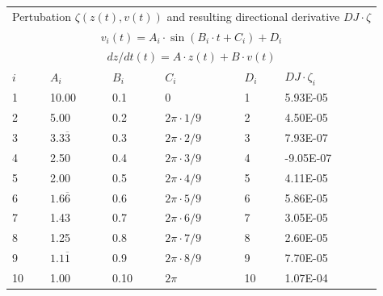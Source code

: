 \begin{center}
    \begin{tabular}{ |p{1cm}||p{2cm}|p{2cm}|p{2cm}|p{2cm}||p{2cm}|  }
        \hline
        \multicolumn{6}{|c|}{Pertubation $\zeta\left(z(t), v(t)\right)$ and resulting directional derivative $DJ\cdot\zeta$} \\
        \multicolumn{6}{|c|}{$v_i(t)=A_i\cdot\sin(B_i\cdot t+C_i)+D_i$}\\
        \multicolumn{6}{|c|}{$dz/dt(t)=A\cdot z(t)+B\cdot v(t)$}\\

        \hline
        $i$& $A_i$ & $B_i$ &$C_i$ & $D_i$ & $DJ\cdot\zeta_i$\\
        \hline
        1   & 10.00    & 0.1 &  $0$ & 1 & 5.93E-05 \\
        2  & 5.00    & 0.2 &  $2\pi\cdot1/9$ & 2 & 4.50E-05    \\
        3 & $3.3\overline{3}$    & 0.3 &  $2\pi\cdot2/9$ & 3 & 7.93E-07\\
        4  & 2.50    & 0.4 &  $2\pi\cdot3/9$ & 4 & -9.05E-07\\
        5 & 2.00    & 0.5 &  $2\pi\cdot4/9$ & 5 & 4.11E-05\\
        6 & $1.6\overline{6}$    & 0.6 &  $2\pi\cdot5/9$ & 6 &5.86E-05 \\
        7 & 1.43    & 0.7 &  $2\pi\cdot6/9$ & 7 &  3.05E-05 \\
        8 & 1.25    & 0.8 &  $2\pi\cdot7/9$ & 8 & 2.60E-05 \\
        9 & $1.1\overline{1}$    & 0.9 &  $2\pi\cdot8/9$ & 9 & 7.70E-05 \\
        10 & 1.00    & 0.10 &  $2\pi$ & 10 & 1.07E-04 \\
        \hline
       \end{tabular}  
\end{center}